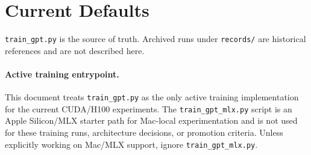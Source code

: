 \documentclass[11pt]{article}
\begin{document}
\section{Current Defaults}
\label{sec:config}

\texttt{train\_gpt.py} is the source of truth.  Archived runs under
\texttt{records/} are historical references and are not described here.

\paragraph{Active training entrypoint.}
This document treats \texttt{train\_gpt.py} as the only active training
implementation for the current CUDA/H100 experiments.  The
\texttt{train\_gpt\_mlx.py} script is an Apple Silicon/MLX starter path for
Mac-local experimentation and is not used for these training runs,
architecture decisions, or promotion criteria.  Unless explicitly working on
Mac/MLX support, ignore \texttt{train\_gpt\_mlx.py}.
\end{document}
